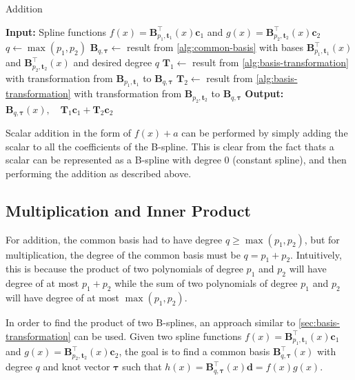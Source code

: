 \begin{algorithm}
    \caption{Addition}\label{alg:addition}
    \begin{algorithmic}[1]
        \State \textbf{Input:} Spline functions $f(x) = \mathbf{B}_{p_1, \mathbf{t}_1}^{\top}(x) \mathbf{c}_1$ and $g(x) = \mathbf{B}_{p_2, \mathbf{t}_2}^{\top}(x) \mathbf{c}_2$
        \State $q \gets \max(p_1, p_2)$
        \State $\mathbf B_{q, \boldsymbol{\tau}} \gets $ result from \cref{alg:common-basis} with bases $\mathbf{B}_{p_1, \mathbf{t}_1}^{\top}(x)$ and $\mathbf{B}_{p_2, \mathbf{t}_2}^{\top}(x)$ and desired degree $q$
        \State $\mathbf T_1 \gets $ result from \cref{alg:basis-transformation} with transformation from $\mathbf B_{p_1, \mathbf{t}_1}$ to $\mathbf B_{q, \boldsymbol{\tau}}$
        \State $\mathbf T_2 \gets $ result from \cref{alg:basis-transformation} with transformation from $\mathbf B_{p_2, \mathbf{t}_2}$ to $\mathbf B_{q, \boldsymbol{\tau}}$
        \State \textbf{Output:} $\mathbf B_{q, \boldsymbol{\tau}}(x), \quad\mathbf T_1 \mathbf c_1 + \mathbf T_2 \mathbf c_2$
    \end{algorithmic}
\end{algorithm}

Scalar addition in the form of $f(x) + a$ can be performed by simply adding the scalar to all the coefficients of the B-spline. This is clear from the fact thats a scalar can be represented as a B-spline with degree $0$ (constant spline), and then performing the addition as described above. 

\subsection{Multiplication and Inner Product}

For addition, the common basis had to have degree $q \geq \max(p_1, p_2)$, but for multiplication, the degree of the common basis must be $q = p_1 + p_2$. Intuitively, this is because the product of two polynomials of degree $p_1$ and $p_2$ will have degree of at most $p_1 + p_2$ while the sum of two polynomials of degree $p_1$ and $p_2$ will have degree of at most $\max(p_1, p_2)$.

In order to find the product of two B-splines, an approach similar to \cref{sec:basis-transformation} can be used. Given two spline functions $f(x) = \mathbf{B}_{p_1, \mathbf{t}_1}^{\top}(x) \mathbf{c}_1$ and $g(x) = \mathbf{B}_{p_2, \mathbf{t}_2}^{\top}(x) \mathbf{c}_2$, the goal is to find a common basis $\mathbf{B}_{q, \boldsymbol{\tau}}^{\top}(x)$ with degree $q$ and knot vector $\boldsymbol{\tau}$ such that $h(x) = \mathbf{B}_{q, \boldsymbol{\tau}}^{\top}(x) \mathbf{d} = f(x)  g(x)$.

